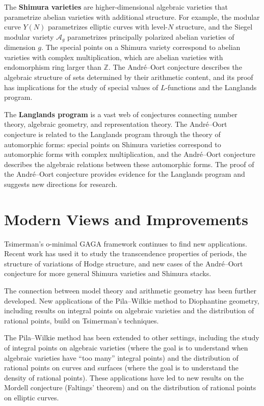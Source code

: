 The \textbf{Shimura varieties} are higher-dimensional algebraic varieties that parametrize abelian varieties with additional structure. For example, the modular curve $Y(N)$ parametrizes elliptic curves with level-$N$ structure, and the Siegel modular variety $\mathcal{A}_g$ parametrizes principally polarized abelian varieties of dimension $g$. The special points on a Shimura variety correspond to abelian varieties with complex multiplication, which are abelian varieties with endomorphism ring larger than $\mathbb{Z}$. The Andr\'{e}--Oort conjecture describes the algebraic structure of sets determined by their arithmetic content, and its proof has implications for the study of special values of $L$-functions and the Langlands program.

The \textbf{Langlands program} is a vast web of conjectures connecting number theory, algebraic geometry, and representation theory. The Andr\'{e}--Oort conjecture is related to the Langlands program through the theory of automorphic forms: special points on Shimura varieties correspond to automorphic forms with complex multiplication, and the Andr\'{e}--Oort conjecture describes the algebraic relations between these automorphic forms. The proof of the Andr\'{e}--Oort conjecture provides evidence for the Langlands program and suggests new directions for research.

\section{Modern Views and Improvements}

Tsimerman's o-minimal GAGA framework continues to find new applications. Recent work has used it to study the transcendence properties of periods, the structure of variations of Hodge structure, and new cases of the Andr\'{e}--Oort conjecture for more general Shimura varieties and Shimura stacks.

The connection between model theory and arithmetic geometry has been further developed. New applications of the Pila--Wilkie method to Diophantine geometry, including results on integral points on algebraic varieties and the distribution of rational points, build on Tsimerman's techniques.

The Pila--Wilkie method has been extended to other settings, including the study of integral points on algebraic varieties (where the goal is to understand when algebraic varieties have ``too many'' integral points) and the distribution of rational points on curves and surfaces (where the goal is to understand the density of rational points). These applications have led to new results on the Mordell conjecture (Faltings' theorem) and on the distribution of rational points on elliptic curves.

